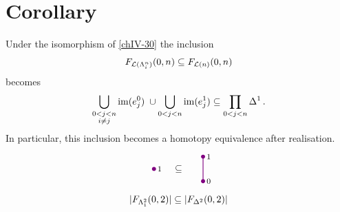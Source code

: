     \section{Corollary}\label{chIV-34}
        Under the isomorphism of \ref{chIV-30} the inclusion
        \begin{equation*}
            F_{\mathcal{L}(\Lambda^{n}_{i})}(0, n) \subseteq F_{\mathcal{L}(n)}(0, n)
        \end{equation*}
        becomes
        \begin{equation*}
            \bigcup_{\substack{0<j<n \\ i \neq j}} \operatorname{im}(e^0_j) \;\cup \bigcup_{0<j<n} \operatorname{im}(e^1_j) \subseteq \prod_{0<j<n} \Delta^1 \,.
        \end{equation*}
        In particular, this inclusion becomes a homotopy equivalence after realisation.
        \begin{equation*}
            \begin{tikzpicture}[
                scale=0.9, 
                thick, 
                color=violet, 
                every node/.style={text=black,font=\footnotesize},
                dot/.style={circle, fill=violet, inner sep=1.5pt, outer sep=0pt}
            ]

                \begin{scope}[shift={(0,0)}]
                    \coordinate (A) at (0, 0);
                    \coordinate (B) at (2, 0.5);
                    \coordinate (C) at (2, -0.5);

                    \node[dot] at (A) {};
                    \node[dot] at (B) {};
                    \node[dot] at (C) {};

                    \draw (B) -- (C);

                    \node[right] at (A) {1};
                    \node[right] at (B) {1};
                    \node[right] at (C) {0};

                    \node at (1, 0) {\normalsize $\subseteq$};
                    \node at (1,-1.3) {\normalsize $|F_{\horn{2}{1}}(0,2)| \subseteq |F_{\Delta^2}(0,2)|$};

                \end{scope}
                \begin{scope}[shift={(4,0)}]
                    \coordinate (A) at (0, -0.5);
                    \coordinate (B) at (0, 0.5);
                    \coordinate (C) at (1, 0.5);
                    \coordinate (D) at (1, -0.5);


\end{scope}
\end{tikzpicture}
\end{equation*}
